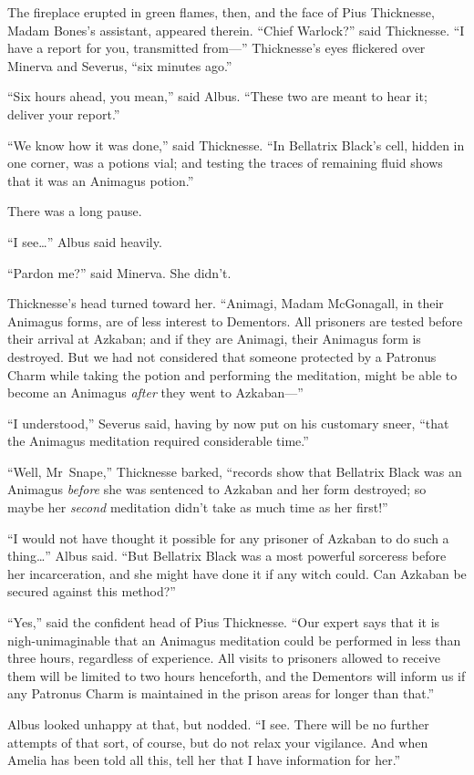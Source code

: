 The fireplace erupted in green flames, then, and the face of Pius Thicknesse, Madam Bones’s assistant, appeared therein.
“Chief Warlock?” said Thicknesse.
“I have a report for you, transmitted from—” Thicknesse’s eyes flickered over Minerva and Severus, “six minutes ago.”

“Six hours ahead, you mean,” said Albus.
“These two are meant to hear it; deliver your report.”

“We know how it was done,” said Thicknesse.
“In Bellatrix Black’s cell, hidden in one corner, was a potions vial; and testing the traces of remaining fluid shows that it was an Animagus potion.”

There was a long pause.

“I see…” Albus said heavily.

“Pardon me?” said Minerva. She didn’t.

Thicknesse’s head turned toward her.
“Animagi, Madam McGonagall, in their Animagus forms, are of less interest to Dementors. All prisoners are tested before their arrival at Azkaban; and if they are Animagi, their Animagus form is destroyed. But we had not considered that someone protected by a Patronus Charm while taking the potion and performing the meditation, might be able to become an Animagus \emph{after} they went to Azkaban—”

“I understood,” Severus said, having by now put on his customary sneer, “that the Animagus meditation required considerable time.”

“Well, Mr~Snape,” Thicknesse barked, “records show that Bellatrix Black was an Animagus \emph{before} she was sentenced to Azkaban and her form destroyed; so maybe her \emph{second} meditation didn’t take as much time as her first!”

“I would not have thought it possible for any prisoner of Azkaban to do such a thing…” Albus said.
“But Bellatrix Black was a most powerful sorceress before her incarceration, and she might have done it if any witch could. Can Azkaban be secured against this method?”

“Yes,” said the confident head of Pius Thicknesse.
“Our expert says that it is nigh-unimaginable that an Animagus meditation could be performed in less than three hours, regardless of experience. All visits to prisoners allowed to receive them will be limited to two hours henceforth, and the Dementors will inform us if any Patronus Charm is maintained in the prison areas for longer than that.”

Albus looked unhappy at that, but nodded.
“I see. There will be no further attempts of that sort, of course, but do not relax your vigilance. And when Amelia has been told all this, tell her that I have information for her.”

